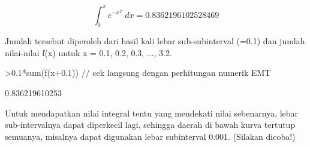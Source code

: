 \documentclass{article}
\begin{document}
\begin{eulernotebook}
\begin{eulercomment}
\begin{eulercomment}
\begin{eulercomment}
\begin{eulercomment}
\begin{eulercomment}
\begin{eulercomment}
\begin{eulercomment}
\end{eulercomment}
\begin{eulerformula}
\[
\int_{0}^{\pi}{e^ {- x^2 }\;dx}=0.8362196102528469
\]
\end{eulerformula}
\begin{eulercomment}
Jumlah tersebut diperoleh dari hasil kali lebar sub-subinterval (=0.1)
dan jumlah nilai-nilai f(x) untuk x = 0.1, 0.2, 0.3, ..., 3.2.
\end{eulercomment}
\begin{eulerprompt}
>0.1*sum(f(x+0.1)) // cek langsung dengan perhitungan numerik EMT
\end{eulerprompt}
\begin{euleroutput}
  0.836219610253
\end{euleroutput}
\begin{eulercomment}
Untuk mendapatkan nilai integral tentu yang mendekati nilai sebenarnya, lebar
sub-intervalnya dapat diperkecil lagi, sehingga daerah di bawah kurva tertutup
semuanya, misalnya dapat digunakan lebar subinterval 0.001. (Silakan dicoba!)


\end{eulercomment}
\end{eulercomment}
\end{eulercomment}
\end{eulercomment}
\end{eulercomment}
\end{eulercomment}
\end{eulercomment}
\end{eulernotebook}
\end{document}
